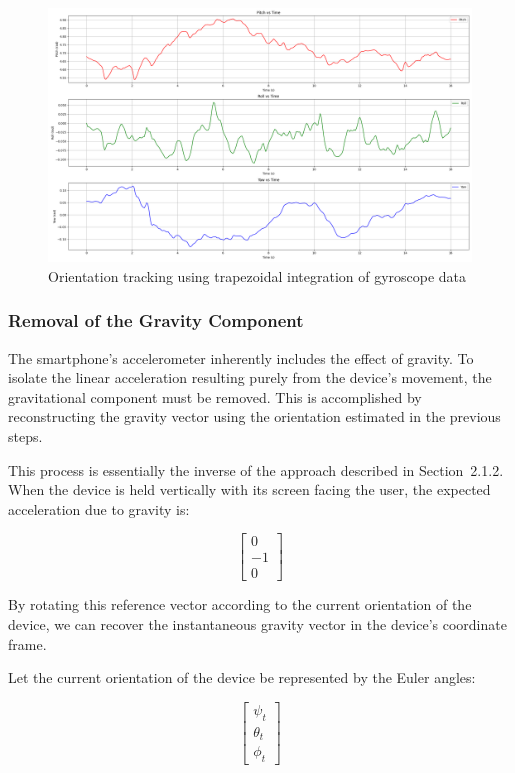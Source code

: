 \documentclass{article}
\begin{document}
\FloatBarrier
\begin{figure}[h]
    \centering
    \includegraphics[width=\textwidth]{2_1_4_1.png}
    \caption{Orientation tracking using trapezoidal integration of gyroscope data}
    \label{fig:gyro_integration}
\end{figure}

\FloatBarrier
\subsubsection{Removal of the Gravity Component}

The smartphone's accelerometer inherently includes the effect of gravity. To isolate the linear acceleration resulting purely from the device’s movement, the gravitational component must be removed. This is accomplished by reconstructing the gravity vector using the orientation estimated in the previous steps.

This process is essentially the inverse of the approach described in Section~2.1.2. When the device is held vertically with its screen facing the user, the expected acceleration due to gravity is:

\[
\begin{bmatrix}
0 \\
-1 \\
0
\end{bmatrix}
\]

By rotating this reference vector according to the current orientation of the device, we can recover the instantaneous gravity vector in the device's coordinate frame.

Let the current orientation of the device be represented by the Euler angles:

\[
\begin{bmatrix}
\psi_t \\
\theta_t \\
\phi_t
\end{bmatrix}
\]
\end{document}
